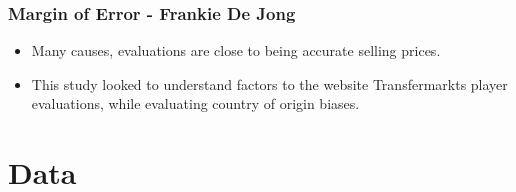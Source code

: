 \documentclass[t,aspectratio=169,xcolor=dvipsnames]{beamer}
\begin{document}
\begin{frame}
    \frametitle{Margin of Error - Frankie De Jong}
    
    \begin{center}
    \end{center}
    
    \begin{itemize}
        \item Many causes, evaluations are close to being accurate selling prices. 
        \item This study looked to understand factors to the website Transfermarkts player evaluations, while evaluating country of origin biases. 
    \end{itemize}
    
\end{frame}

\section{Data}
\end{document}
